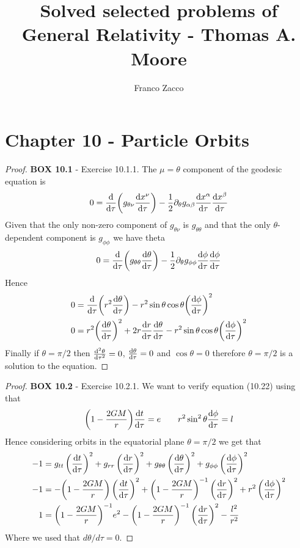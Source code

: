 \documentclass[11pt]{article}
\title{\textbf{Solved selected problems of General Relativity - Thomas A. Moore}}
\author{Franco Zacco}
\date{}
\theoremstyle{definition}
\begin{document}
\maketitle
\thispagestyle{empty}

\section*{Chapter 10 - Particle Orbits}

\begin{proof}{\textbf{BOX 10.1} - Exercise 10.1.1.}
    The $\mu = \theta$ component of the geodesic equation is
    \begin{align*}
        0 = \dv{\tau}(g_{\theta\nu}\dv{x^\nu}{\tau})
        - \frac{1}{2}\partial_\theta g_{\alpha\beta}
        \dv{x^\alpha}{\tau}\dv{x^\beta}{\tau}
    \end{align*}
    Given that the only non-zero component of $g_{\theta\nu}$ is
    $g_{\theta\theta}$ and that the only $\theta$-dependent component is
    $g_{\phi\phi}$ we have theta
    \begin{align*}
        0 = \dv{\tau}(g_{\theta\theta}\dv{\theta}{\tau})
        - \frac{1}{2}\partial_\theta g_{\phi\phi}
        \dv{\phi}{\tau}\dv{\phi}{\tau}
    \end{align*}
    Hence
    \begin{align*}
        0 &= \dv{\tau}(r^2\dv{\theta}{\tau})
        - r^2\sin\theta\cos\theta \bigg(\dv{\phi}{\tau}\bigg)^2\\
        0 &= r^2\bigg(\dv{\theta}{\tau}\bigg)^2
        + 2r\dv{r}{\tau}\dv{\theta}{\tau}
        - r^2\sin\theta\cos\theta \bigg(\dv{\phi}{\tau}\bigg)^2
    \end{align*}
    Finally if $\theta = \pi/2$ then $\dv[2]{\theta}{\tau} = 0$,
    $\dv{\theta}{\tau} = 0$ and $\cos\theta = 0$ therefore $\theta = \pi/2$
    is a solution to the equation.
\end{proof}
\cleardoublepage
\begin{proof}{\textbf{BOX 10.2} - Exercise 10.2.1.}
    We want to verify equation (10.22) using that
    \begin{align*}
        \bigg(1 - \frac{2GM}{r}\bigg)\dv{t}{\tau} = e
        \qquad r^2\sin^2\theta\dv{\phi}{\tau} = l
    \end{align*}
    Hence considering orbits in the equatorial plane $\theta = \pi/2$ we get
    that
    \begin{align*}
        -1 &= g_{tt}\left(\dv{t}{\tau}\right)^2 + g_{rr}\left(\dv{r}{\tau}\right)^2
        + g_{\theta\theta}\left(\dv{\theta}{\tau}\right)^2
        + g_{\phi\phi}\left(\dv{\phi}{\tau}\right)^2\\
        -1 &= -\bigg(1 - \frac{2GM}{r}\bigg)\left(\dv{t}{\tau}\right)^2
        + \bigg(1 - \frac{2GM}{r}\bigg)^{-1}\left(\dv{r}{\tau}\right)^2
        + r^2\left(\dv{\phi}{\tau}\right)^2\\
        1 &= \bigg(1 - \frac{2GM}{r}\bigg)^{-1}e^2
        - \bigg(1 - \frac{2GM}{r}\bigg)^{-1}\left(\dv{r}{\tau}\right)^2
        - \frac{l^2}{r^2}
    \end{align*}
    Where we used that $d\theta/d\tau = 0$.
\end{proof}
\end{document}
